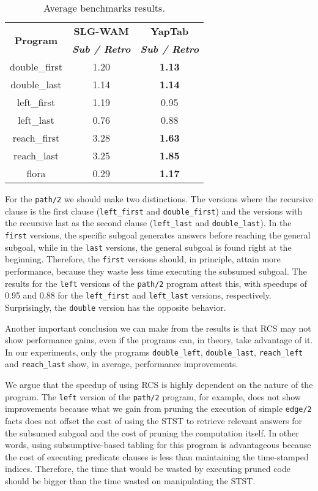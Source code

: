 \begin{table}[ht]
\centering
  \begin{tabular}{ccc}
   \hline
    \hline
    \multirow{2}{*}{\textbf{Program}} & \textbf{SLG-WAM} & \textbf{YapTab} \\
    & \textbf{\textit{\small{Sub / Retro}}} & \textbf{\textit{\small{Sub / Retro}}} \\
   \hline
   \hline
double\_first & 1.20 & \textbf{1.13} \\
double\_last & 1.14 & \textbf{1.14} \\
left\_first & 1.19 & 0.95 \\
left\_last & 0.76  & 0.88 \\
reach\_first  & 3.28 & \textbf{1.63} \\
reach\_last  & 3.25 & \textbf{1.85} \\
flora & 0.29 & \textbf{1.17} \\
\hline
\hline
\end{tabular}
\caption{Average benchmarks results.}
\label{tbl:results_gain_overview}
\end{table}

For the \texttt{path/2} we should make two distinctions. The versions where the recursive clause is the first
clause (\texttt{left\_first} and \texttt{double\_first}) and the versions with the recursive last as the second
clause (\texttt{left\_last} and \texttt{double\_last}). In the \texttt{first} versions, the specific subgoal
generates answers before reaching the general subgoal, while in the \texttt{last} versions, the general subgoal
is found right at the beginning. Therefore, the \texttt{first} versions should, in principle, attain more performance,
because they waste less time executing the subsumed subgoal. The results for the \texttt{left} versions of the
\texttt{path/2} program attest this, with speedups of 0.95 and 0.88 for the \texttt{left\_first} and
\texttt{left\_last} versions, respectively. Surprisingly, the \texttt{double} version has the opposite behavior.

Another important conclusion we can make from the results is that RCS may not show performance gains, even if the
programs can, in theory, take advantage of it. In our experiments, only the programs \texttt{double\_left},
\texttt{double\_last}, \texttt{reach\_left} and \texttt{reach\_last} show, in average, performance improvements.

We argue that the speedup of using RCS is highly dependent on the nature of the program.
The \texttt{left} version
of the \texttt{path/2} program, for example, does not show improvements because what we gain from pruning the
execution of simple \texttt{edge/2} facts does not offset the cost of using the STST to retrieve relevant answers
for the subsumed subgoal and
the cost of pruning the computation itself. In other words, using subsumptive-based tabling for this program is
advantageous because the cost of executing predicate clauses is less than maintaining the time-stamped indices.
Therefore, the time that would be wasted by executing pruned code should be bigger than the time wasted on manipulating
the STST.

